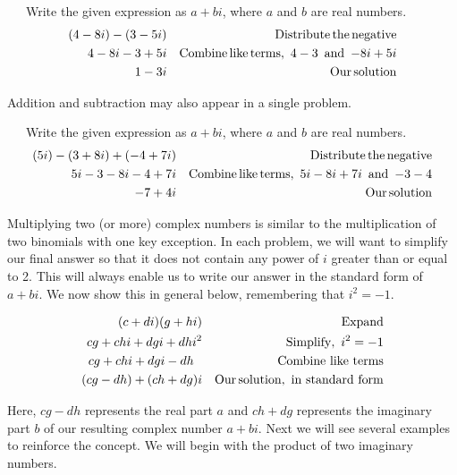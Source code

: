 \begin{example}~~~Write the given expression as $a+bi$, where $a$ and $b$ are real numbers.
  \begin{eqnarray*}
    (4 - 8 i) - (3 - 5 i) &  & \operatorname{Distribute} \operatorname{the} \operatorname{negative}\\
    4 - 8 i - 3 + 5 i &  & \operatorname{Combine} \operatorname{like} \operatorname{terms,~} 4 - 3
    \operatorname{~and~} - 8 i + 5 i\\
    1 - 3 i &  & \operatorname{Our} \operatorname{solution}
  \end{eqnarray*}
\end{example}

Addition and subtraction may also appear in a single problem.

\begin{example}~~~Write the given expression as $a+bi$, where $a$ and $b$ are real numbers.
  \begin{eqnarray*}
    (5 i) - (3 + 8 i) + (- 4 + 7 i) &  & \operatorname{Distribute} \operatorname{the}
    \operatorname{negative}\\
    5 i - 3 - 8 i - 4 + 7 i &  & \operatorname{Combine} \operatorname{like} \operatorname{terms,~} 5 i -
    8 i + 7 i \operatorname{~and~} - 3 - 4\\
    - 7 + 4 i &  & \operatorname{Our} \operatorname{solution}
  \end{eqnarray*}
\end{example}

Multiplying two (or more) complex numbers is similar to the multiplication of two binomials with one key exception.  In each problem, we will want to simplify our final answer so that it does not contain any power of $i$ greater than or equal to 2.  This will always enable us to write our answer in the standard form of $a+bi$.  We now show this in general below, remembering that $i^2=-1$.

\begin{eqnarray*}
    (c+di)(g+hi) &  & \operatorname{Expand}\\
    cg+chi+dgi+dhi^2 &  & \operatorname{Simplify,~} i^2=-1\\
    cg+chi+dgi-dh~~ &  & \operatorname{Combine~like~terms}\\
    (cg-dh)+(ch+dg)i &  & \operatorname{Our} \operatorname{solution,~in~standard~form}
\end{eqnarray*}

Here, $cg-dh$ represents the real part $a$ and $ch+dg$ represents the imaginary part $b$ of our resulting complex number $a+bi$.\pp
Next we will see several examples to reinforce the concept.  We will begin with the product of two imaginary numbers.

